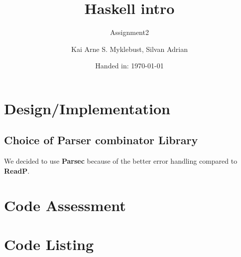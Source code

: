 \documentclass[12pt,a4paper]{article}
\begin{document}
\title{Haskell intro}
\subtitle{Assignment2}

\author{Kai Arne S. Myklebust, Silvan Adrian}
\date{Handed in: \today}
	
\maketitle
\tableofcontents

\section{Design/Implementation}


\subsection{Choice of Parser combinator Library}
We decided to use \textbf{Parsec} because of the better error handling compared to \textbf{ReadP}.

\section{Code Assessment}

\appendix
\section{Code Listing}

\inputminted{haskell}{handin/src/SubsInterpreter.hs}
\end{document}
